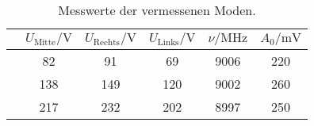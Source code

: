 \begin{table}[H]
  \centering
  \caption{Messwerte der vermessenen Moden.}
  \label{tab:tab1}
    \begin{tabular}{S S S S S S}
    \toprule
    $ $ & $U_\text{Mitte}/\si{\V}$ & $ U_\text{Rechts}/\si{\V}$ &
    $ {U_\text{Links}/\si{\V}}$ &$ {\nu /\si{\MHz}} $ & ${A_0 /\si{\mV}}$\\
    \midrule
     & 82 & 91 & 69 & 9006 & 220\\
     & 138 & 149 & 120 & 9002 & 260\\
     & 217 & 232 & 202 & 8997 & 250\\

    \bottomrule
    \end{tabular}
\end{table}
